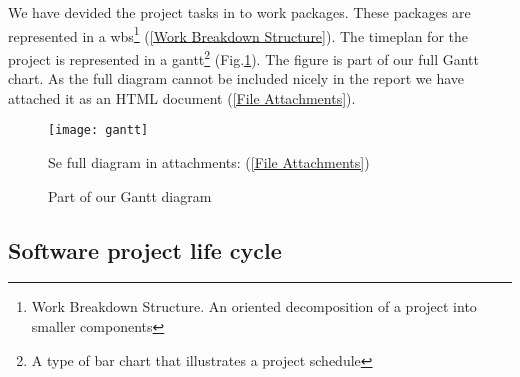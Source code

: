     We have devided the project tasks in to work packages. These packages are represented in a \gls{wbs}\footnote{Work Breakdown Structure. An oriented decomposition of a project into smaller components} (\ref{Work Breakdown Structure}). The timeplan for the project is represented in a \gls{gantt}\footnote{A type of bar chart that illustrates a project schedule} (Fig.\ref{fig:gantt}). The figure is part of our full Gantt chart. As the full diagram cannot be included nicely in the report we have attached it as an HTML document (\ref{File Attachments}).
     
        \begin{figure}[h]
            \centering
            \texttt{[image: gantt]}
            \caption{Part of our Gantt diagram} Se full diagram in attachments: (\ref{File Attachments})
            \label{fig:gantt}
        \end{figure}
    
    \subsection{Software project life cycle}\label{Software project life cycle}
    
